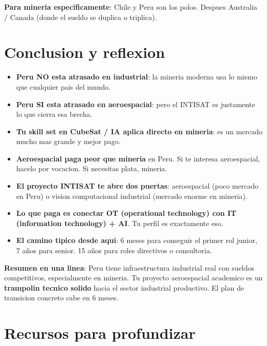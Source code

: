 \documentclass[11pt,a4paper,oneside]{report}
\begin{document}
\textbf{Para mineria especificamente}: Chile y Peru son los polos. Despues
Australia / Canada (donde el sueldo se duplica o triplica).

\chapter{Conclusion y reflexion}

\begin{itemize}[leftmargin=2em]
  \item \textbf{Peru NO esta atrasado en industrial}: la mineria moderna usa
        lo mismo que cualquier pais del mundo.
  \item \textbf{Peru SI esta atrasado en aeroespacial}: pero el INTISAT
        es justamente lo que cierra esa brecha.
  \item \textbf{Tu skill set en CubeSat / IA aplica directo en mineria}:
        es un mercado mucho mas grande y mejor pago.
  \item \textbf{Aeroespacial paga peor que mineria} en Peru. Si te interesa
        aeroespacial, hacelo por vocacion. Si necesitas plata, mineria.
  \item \textbf{El proyecto INTISAT te abre dos puertas}: aeroespacial
        (poco mercado en Peru) o vision computacional industrial (mercado
        enorme en mineria).
  \item \textbf{Lo que paga es conectar OT (operational technology) con IT
        (information technology) + AI}. Tu perfil es exactamente eso.
  \item \textbf{El camino tipico desde aqui}: 6 meses para conseguir el
        primer rol junior, 7 años para senior. 15 años para roles
        directivos o consultoria.
\end{itemize}

\begin{tip}
\textbf{Resumen en una linea}: Peru tiene infraestructura industrial
real con sueldos competitivos, especialmente en mineria. Tu proyecto
aeroespacial academico es un \textbf{trampolin tecnico solido} hacia
el sector industrial productivo. El plan de transicion concreto cabe
en 6 meses.
\end{tip}

\chapter*{Recursos para profundizar}
\end{document}
